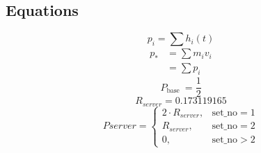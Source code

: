 \subsection{Equations}


\begin{equation}
p_i=\sum h_i(t)
\end{equation}
\begin{equation}
\begin{aligned}
p_* & =\sum m_i v_i \\
& =\sum p_i
\end{aligned}
\end{equation}
\begin{equation}
P_{\text {base }}=\frac{1}{2} \end{equation}\begin{equation}
R_{server}=0.173119165
\end{equation}
\[ Pserver = \left\{
\begin{array}{ll}
2 \cdot R_{server}, & \text{set\_no} = 1 \\
R_{server}, & \text{set\_no} = 2 \\
0, & \text{set\_no} > 2
\end{array}
\right.
\]

